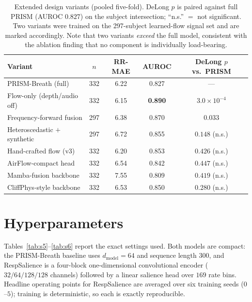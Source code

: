 \documentclass[journal]{IEEEtran}
\begin{document}
\begin{table}[!t]
\caption{Extended design variants (pooled five-fold). DeLong $p$ is paired against full PRISM
(AUROC $0.827$) on the subject intersection; ``n.s.'' $=$ not significant. Two variants were trained on
the 297-subject learned-flow signal set and are marked accordingly. Note that two variants
\emph{exceed} the full model, consistent with the ablation finding that no component is individually
load-bearing.}
\label{tab:s4}\centering\small
\begin{tabular}{@{}lcccc@{}}\toprule
Variant & $n$ & RR-MAE & AUROC & DeLong $p$ vs.\ PRISM\\\midrule
PRISM-Breath (full) & 332 & 6.22 & 0.827 & --- \\
Flow-only (depth/audio off) & 332 & 6.15 & \textbf{0.890} & $3.0{\times}10^{-4}$ \\
Frequency-forward fusion & 297 & 6.38 & 0.870 & $0.033$ \\
Heteroscedastic $+$ synthetic & 297 & 6.72 & 0.855 & $0.148$ (n.s.) \\
Hand-crafted flow (v3) & 332 & 6.20 & 0.853 & $0.426$ (n.s.) \\
AirFlow-compact head & 332 & 6.54 & 0.842 & $0.447$ (n.s.) \\\midrule
Mamba-fusion backbone & 332 & 7.55 & 0.809 & $0.419$ (n.s.) \\
CliffPhys-style backbone & 332 & 6.53 & 0.850 & $0.280$ (n.s.) \\\bottomrule
\end{tabular}
\end{table}

\section{Hyperparameters}
Tables~\ref{tab:s5}--\ref{tab:s6} report the exact settings used. Both models are compact: the
PRISM-Breath baseline uses $d_{\text{model}}=64$ and sequence length $300$, and RespSalience is a
four-block one-dimensional convolutional encoder ($32/64/128/128$ channels) followed by a linear
salience head over $169$ rate bins. Headline operating points for RespSalience are averaged over six
training seeds ($0$--$5$); training is deterministic, so each is exactly reproducible.
\end{document}
